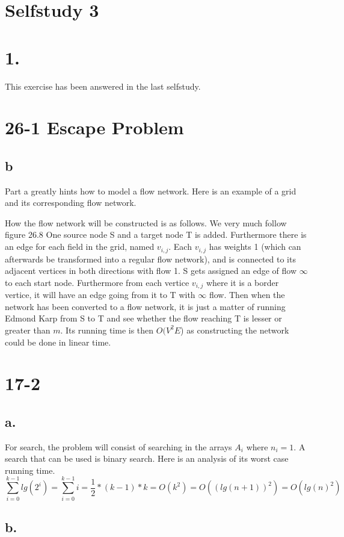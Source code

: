 \documentclass[12pt,a4paper]{report}
\begin{document}
\section*{Selfstudy 3}
\section*{1.}
This exercise has been answered in the last selfstudy.
\section*{26-1 Escape Problem}
\subsection*{b}
Part a greatly hints how to model a flow network.
Here is an example of a grid and its corresponding flow network.

How the flow network will be constructed is as follows.
We very much follow figure 26.8
One source node S and a target node T is added.
Furthermore there is an edge for each field in the grid, named $v_{i,j}$. 
Each $v_{i,j}$ has weights 1 (which can afterwards be transformed into a regular flow network), and is connected to its adjacent vertices in both directions with flow 1.
S gets assigned an edge of flow $\infty$ to each start node.
Furthermore from each vertice $v_{i,j}$ where it is a border vertice, it will have an edge going from it to T with $\infty$ flow.
Then when the network has been converted to a flow network, it is just a matter of running Edmond Karp from S to T and see whether the flow reaching T is lesser or greater than $m$.
Its running time is then $O(V^2E$) as constructing the network could be done in linear time.

\section*{17-2}
\subsection*{a.}
For search, the problem will consist of searching in the arrays $A_i$ where $n_i = 1$.
A search that can be used is binary search.
Here is an analysis of its worst case running time.
$$\sum\limits_{i=0}^{k-1} lg(2^i) = \sum\limits_{i=0}^{k-1} i = \frac{1}{2} * (k-1) * k = O(k^2) = O((lg(n+1))^2) = O(lg(n)^2)$$

\subsection*{b.} 
\end{document}
